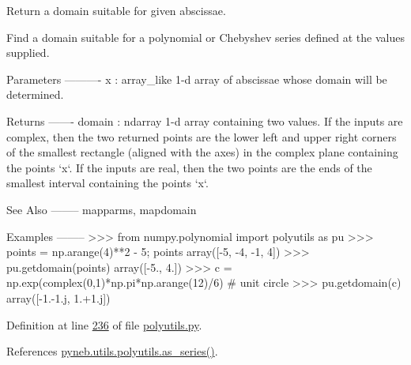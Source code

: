 \begin{DoxyVerb}Return a domain suitable for given abscissae.

Find a domain suitable for a polynomial or Chebyshev series
defined at the values supplied.

Parameters
----------
x : array_like
    1-d array of abscissae whose domain will be determined.

Returns
-------
domain : ndarray
    1-d array containing two values.  If the inputs are complex, then
    the two returned points are the lower left and upper right corners
    of the smallest rectangle (aligned with the axes) in the complex
    plane containing the points `x`. If the inputs are real, then the
    two points are the ends of the smallest interval containing the
    points `x`.

See Also
--------
mapparms, mapdomain

Examples
--------
>>> from numpy.polynomial import polyutils as pu
>>> points = np.arange(4)**2 - 5; points
array([-5, -4, -1,  4])
>>> pu.getdomain(points)
array([-5.,  4.])
>>> c = np.exp(complex(0,1)*np.pi*np.arange(12)/6) # unit circle
>>> pu.getdomain(c)
array([-1.-1.j,  1.+1.j])\end{DoxyVerb}
 

Definition at line \hyperlink{polyutils_8py_source_l00236}{236} of file \hyperlink{polyutils_8py_source}{polyutils.\-py}.



References \hyperlink{polyutils_8py_source_l00115}{pyneb.\-utils.\-polyutils.\-as\-\_\-series()}.


